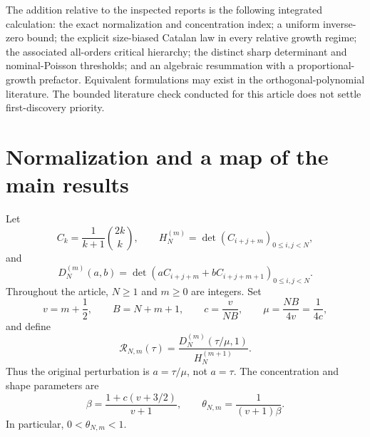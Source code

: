 \documentclass[11pt,a4paper]{article}
\numberwithin{equation}{section}
\theoremstyle{definition}
\theoremstyle{remark}
\newcommand{\Rgs}{\mathcal R}
\begin{document}
The addition relative to the inspected reports is the following integrated
calculation: the exact normalization and concentration index; a uniform
inverse-zero bound; the explicit size-biased Catalan law in every relative
growth regime; the associated all-orders critical hierarchy; the distinct
sharp determinant and nominal-Poisson thresholds; and an algebraic resummation
with a proportional-growth prefactor. Equivalent formulations may exist in
the orthogonal-polynomial literature. The bounded literature check conducted
for this article does not settle first-discovery priority.

\section{Normalization and a map of the main results}
\label{gs:sec:normalization}

Let
\begin{equation}
 C_k=\frac{1}{k+1}\binom{2k}{k},\qquad
 H_N^{(m)}=\det(C_{i+j+m})_{0\le i,j<N},
\end{equation}
and
\begin{equation}
 D_N^{(m)}(a,b)=\det(aC_{i+j+m}+bC_{i+j+m+1})_{0\le i,j<N}.
\end{equation}
Throughout the article, $N\ge1$ and $m\ge0$ are integers. Set
\begin{equation}\label{gs:eq:params}
 v=m+\frac12,\qquad B=N+m+1,\qquad
 c=\frac{v}{NB},\qquad \mu=\frac{NB}{4v}=\frac1{4c},
\end{equation}
and define
\begin{equation}\label{gs:eq:Rdef}
 \Rgs_{N,m}(\tau)=\frac{D_N^{(m)}(\tau/\mu,1)}{H_N^{(m+1)}}.
\end{equation}
Thus the original perturbation is $a=\tau/\mu$, not $a=\tau$.
The concentration and shape parameters are
\begin{equation}\label{gs:eq:beta-theta}
 \boxed{\quad
 \beta=\frac{1+c(v+3/2)}{v+1},\qquad
 \theta_{N,m}=\frac{1}{(v+1)\beta}.
 \quad}
\end{equation}
In particular, $0<\theta_{N,m}<1$.
\end{document}
